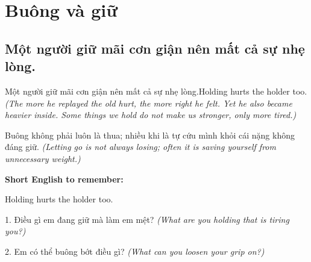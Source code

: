 \chapter{Buông và giữ}

\section{Một người giữ mãi cơn giận nên mất cả sự nhẹ lòng.}
\begin{truyen}{Một người giữ mãi cơn giận nên mất cả sự nhẹ lòng.}{Holding hurts the holder too.}
\textit{(The more he replayed the old hurt, the more right he felt. Yet he also became heavier inside. Some things we hold do not make us stronger, only more tired.)}
\end{truyen}
\begin{baihoc}
Buông không phải luôn là thua; nhiều khi là tự cứu mình khỏi cái nặng không đáng giữ.
\textit{(Letting go is not always losing; often it is saving yourself from unnecessary weight.)}
\end{baihoc}
\begin{ghinhoanh}\textbf{Short English to remember:}

Holding hurts the holder too.
\end{ghinhoanh}
\begin{tuhocnhanh}
1. Điều gì em đang giữ mà làm em mệt? \textit{(What are you holding that is tiring you?)}

2. Em có thể buông bớt điều gì? \textit{(What can you loosen your grip on?)}
\end{tuhocnhanh}
\ngancach

